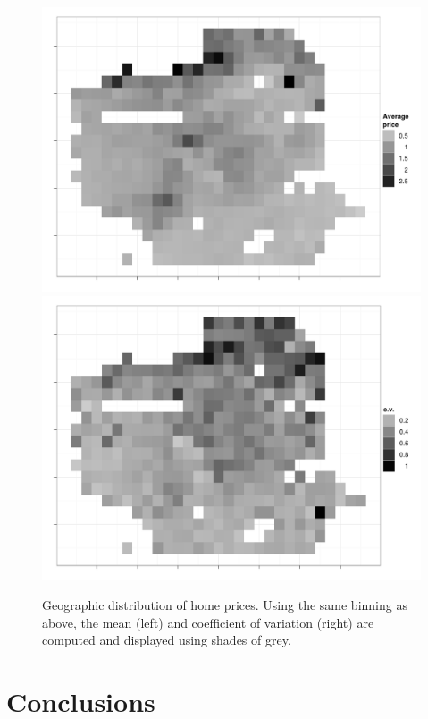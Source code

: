 \documentclass[oneside]{article}
\begin{document}
\begin{figure}[htbp]
  \centering
    \includegraphics[width=0.5\linewidth]{sf-bin-price}%
    \includegraphics[width=0.5\linewidth]{sf-bin-cv}
  \caption{Geographic distribution of home prices.  Using the same binning as above, the mean (left) and coefficient of variation (right) are computed and displayed using shades of grey.}
  \label{fig:sf-price}
\end{figure}


\section{Conclusions}

\end{document}
